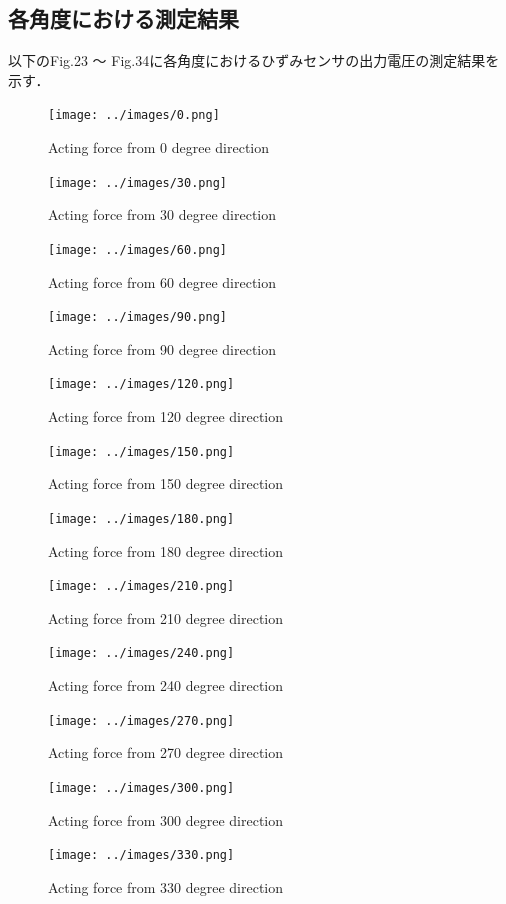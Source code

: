 \documentclass[twocolumn,a4j]{jsarticle}
\begin{document}
\subsection{各角度における測定結果}
以下のFig.23 ～ Fig.34に各角度におけるひずみセンサの出力電圧の測定結果を示す．

\begin{figure}[htbp]
    \footnotesize
    \begin{center}
        \texttt{[image: ../images/0.png]}
        \caption{Acting force from 0 degree direction}
        \texttt{[image: ../images/30.png]}
        \caption{Acting force from 30 degree direction}
    \end{center}
\end{figure}

\begin{figure}[htbp]
    \footnotesize
    \begin{center}
        \texttt{[image: ../images/60.png]}
        \caption{Acting force from 60 degree direction}
        \texttt{[image: ../images/90.png]}
        \caption{Acting force from 90 degree direction}
        \texttt{[image: ../images/120.png]}
        \caption{Acting force from 120 degree direction}
        \texttt{[image: ../images/150.png]}
        \caption{Acting force from 150 degree direction}
    \end{center}
\end{figure}

\begin{figure}[htbp]
    \footnotesize
    \begin{center}
        \texttt{[image: ../images/180.png]}
        \caption{Acting force from 180 degree direction}
        \texttt{[image: ../images/210.png]}
        \caption{Acting force from 210 degree direction}
        \texttt{[image: ../images/240.png]}
        \caption{Acting force from 240 degree direction}
    \end{center}
\end{figure}

\begin{figure}[htbp]
    \footnotesize
    \begin{center}
        \texttt{[image: ../images/270.png]}
        \caption{Acting force from 270 degree direction}
        \texttt{[image: ../images/300.png]}
        \caption{Acting force from 300 degree direction}
        \texttt{[image: ../images/330.png]}
        \caption{Acting force from 330 degree direction}
    \end{center}
\end{figure}
\end{document}
